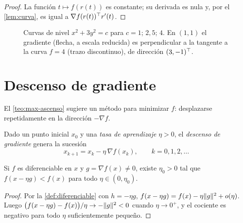 \begin{proof}
La función $t\mapsto f(r(t))$ es constante; su derivada es nula y, por el \cref{lem:curva}, es igual a $\nabla f(r(t))^{\top} r'(t)$.
\end{proof}

\begin{figure}[h]
\centering
{}
\caption{Curvas de nivel $x^{2}+3y^{2}=c$ para $c=1$; $2{,}5$; $4$. En $(1,1)$ el gradiente (flecha, a escala reducida) es perpendicular a la tangente a la curva $f=4$ (trazo discontinuo), de dirección $(3,-1)^{\top}$.}
\label{fig:nivel}
\end{figure}

\section{Descenso de gradiente}

El \cref{teo:max-ascenso} sugiere un método para minimizar $f$: desplazarse repetidamente en la dirección $-\nabla f$.

\begin{definicion}\label{def:dg}
Dado un punto inicial $x_0$ y una \emph{tasa de aprendizaje} $\eta>0$, el \emph{descenso de gradiente} genera la sucesión
\[
x_{k+1}=x_k-\eta\,\nabla f(x_k),\qquad k=0,1,2,\dots
\]
\end{definicion}

\begin{proposicion}\label{prop:descenso}
Si $f$ es diferenciable en $x$ y $g=\nabla f(x)\ne 0$, existe $\eta_0>0$ tal que $f(x-\eta g)<f(x)$ para todo $\eta\in(0,\eta_0)$.
\end{proposicion}

\begin{proof}
Por la \cref{def:diferenciable} con $h=-\eta g$, $f(x-\eta g)=f(x)-\eta\lVert g\rVert^{2}+o(\eta)$. Luego $\bigl(f(x-\eta g)-f(x)\bigr)/\eta\to-\lVert g\rVert^{2}<0$ cuando $\eta\to 0^{+}$, y el cociente es negativo para todo $\eta$ suficientemente pequeño.
\end{proof}

